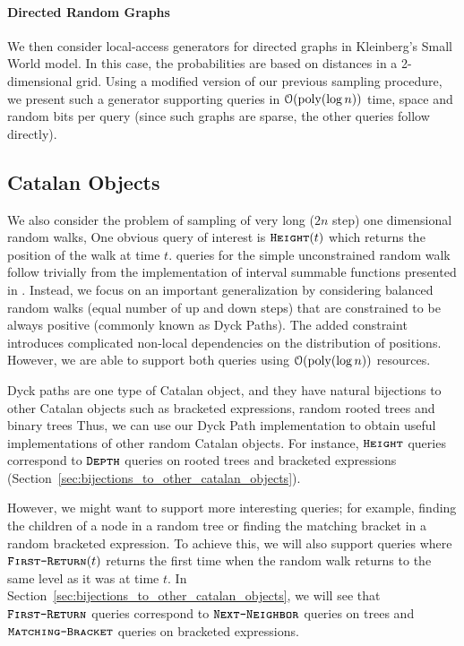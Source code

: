 \paragraph*{Directed Random Graphs}
\label{par:directed_random_graphs}
We then consider local-access generators for directed graphs in Kleinberg's Small World model.
In this case, the probabilities are based on distances in a 2-dimensional grid.
Using a modified version of our previous sampling procedure, we present such a generator supporting  queries in
$\mathcal{O}(\mathrm{poly}(\log n))$ time, space and random bits per query (since such graphs are sparse, the other queries follow directly).




\subsection{Catalan Objects}%
\label{sec:intro_catalan_objects}
We also consider the problem of sampling of very long ($2n$ step) one dimensional random walks,
One obvious query of interest is $\texttt{\textsc{Height}}(t)$ which returns the position of the walk at time $t$.
 queries for the simple unconstrained random walk
follow trivially from the implementation of interval summable functions presented in \cite{huge}.
Instead, we focus on an important generalization by considering balanced random walks (equal number of up and down steps)
that are constrained to be always positive (commonly known as Dyck Paths).
The added constraint introduces complicated non-local dependencies on the distribution of positions.
However, we are able to support both queries using $\mathcal O(\mathrm{poly}(\log n))$ resources.

Dyck paths are one type of Catalan object, and they have natural bijections to other Catalan objects
such as bracketed expressions, random rooted trees and binary trees
Thus, we can use our Dyck Path implementation to obtain useful implementations of other random Catalan objects.
For instance, $\texttt{\textsc{Height}}$ queries correspond to $\texttt{\textsc{Depth}}$ queries on rooted trees and bracketed expressions
(Section~\ref{sec:bijections_to_other_catalan_objects}).

However, we might want to support more interesting queries; for example,
finding the children of a node in a random tree or finding the matching bracket in a random bracketed expression.
To achieve this, we will also support  queries
where $\texttt{\textsc{First-Return}}(t)$ returns the first time when the random walk returns to the same level as it was at time $t$.
In Section~\ref{sec:bijections_to_other_catalan_objects}, we will see that $\texttt{\textsc{First-Return}}$ queries correspond to
$\texttt{\textsc{Next-Neighbor}}$ queries on trees and $\texttt{\textsc{Matching-Bracket}}$ queries on bracketed expressions.





